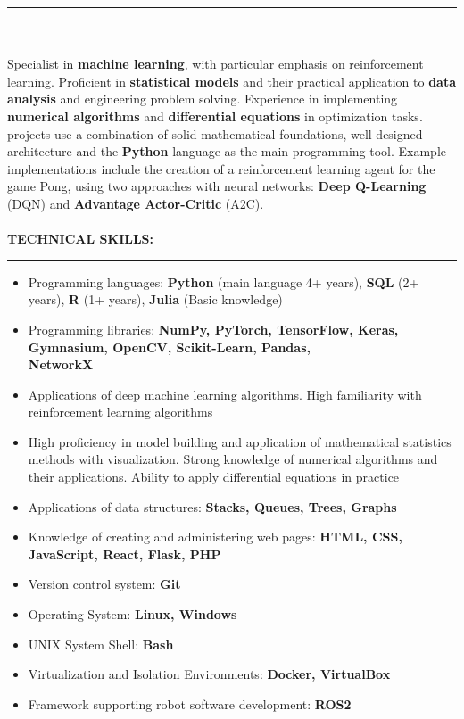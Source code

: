 \documentclass[10pt]{article}
\newcommand{\longline}{\rule{19.6cm}{1pt}}
\begin{document}
\noindent \longline 
\\ \\
\noindent Specialist in \textbf{machine learning}, with particular emphasis on reinforcement learning. 
Proficient in \textbf{statistical models} and their practical application to \textbf{data analysis} and engineering problem solving.
Experience in implementing \textbf{numerical algorithms} and \textbf{differential equations} in optimization tasks. 
projects use a combination of solid mathematical foundations, well-designed architecture and the \textbf{Python} language as the main programming tool. 
Example implementations include the creation of a reinforcement learning agent for the game Pong, 
using two approaches with neural networks: \textbf{Deep Q-Learning} (DQN) and \textbf{Advantage Actor-Critic} (A2C).
\\ \\
\noindent \fontsize{14pt}{14pt}\selectfont \textbf{\color{Violet}TECHNICAL SKILLS:}
\fontsize{10pt}{10pt}\selectfont 
\\ 
\noindent \longline 
\begin{itemize}[leftmargin=*, parsep=0.5pt]
    \item Programming languages: \textbf{Python} (main language 4+ years), \textbf{SQL} (2+ years), \textbf{R} (1+ years), \textbf{Julia} (Basic knowledge)
    \item Programming libraries: \textbf{NumPy, PyTorch, TensorFlow, Keras, Gymnasium, OpenCV, Scikit-Learn, Pandas, \\ NetworkX}
    \item Applications of deep machine learning algorithms. High familiarity with reinforcement learning algorithms
    \item High proficiency in model building and application of mathematical statistics methods with visualization. Strong knowledge of
    numerical algorithms and their applications. Ability to apply differential equations in practice
    \item Applications of data structures: \textbf{Stacks, Queues, Trees, Graphs}
    \item Knowledge of creating and administering web pages: \textbf{HTML, CSS, JavaScript, React, Flask, PHP}
    \item Version control system: \textbf{Git}
    \item Operating System: \textbf{Linux, Windows}
    \item UNIX System Shell: \textbf{Bash} 
    \item Virtualization and Isolation Environments: \textbf{Docker, VirtualBox}
    \item Framework supporting robot software development: \textbf{ROS2}
\end{itemize}
\end{document}
